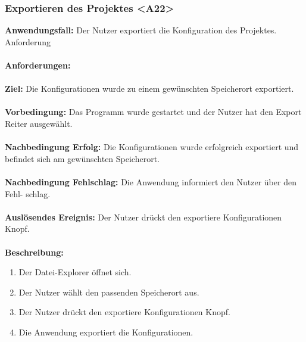 \documentclass[parskip=full]{scrartcl} %
\begin{document}
\subsubsection*{Exportieren des Projektes <A22>}
\textbf{Anwendungsfall:} Der Nutzer exportiert die Konfiguration des Projektes.
Anforderung \\\\
\textbf{Anforderungen:} \\\\
\textbf{Ziel:} Die Konfigurationen wurde zu einem gewünschten Speicherort exportiert.\\\\
\textbf{Vorbedingung:} Das Programm wurde gestartet und der Nutzer hat den Export Reiter ausgewählt.\\\\
\textbf{Nachbedingung Erfolg:} Die Konfigurationen wurde erfolgreich exportiert und befindet sich am gewünschten Speicherort.\\\\
\textbf{Nachbedingung Fehlschlag:}  Die Anwendung informiert den Nutzer über den Fehl-  
schlag.\\\\
\textbf{Auslösendes Ereignis:} Der Nutzer drückt den exportiere Konfigurationen Knopf. \\\\
\textbf{Beschreibung:}
\begin{enumerate}
    \item Der Datei-Explorer öffnet sich.
    \item Der Nutzer wählt den passenden Speicherort aus.
    \item Der Nutzer drückt den exportiere Konfigurationen Knopf.
    \item Die Anwendung exportiert die Konfigurationen.
\end{enumerate}
\newpage
\end{document}
